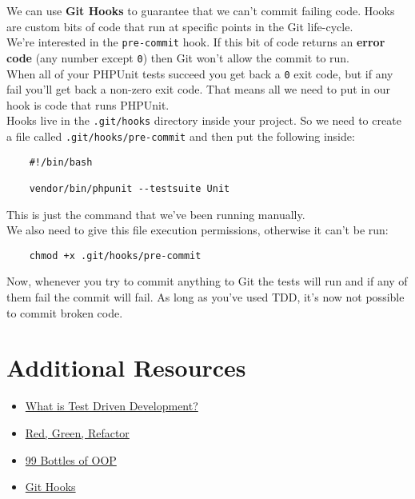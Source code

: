 We can use \textbf{Git Hooks} to guarantee that we can't commit failing code. Hooks are custom bits of code that run at specific points in the Git life-cycle.
\\

We're interested in the \texttt{pre-commit} hook. If this bit of code returns an \textbf{error code} (any number except \texttt{0}) then Git won't allow the commit to run.
\\

When all of your PHPUnit tests succeed you get back a \texttt{0} exit code, but if any fail you'll get back a non-zero exit code. That means all we need to put in our hook is code that runs PHPUnit.
\\

Hooks live in the \texttt{.git/hooks} directory inside your project. So we need to create a file called \texttt{.git/hooks/pre-commit} and then put the following inside:

\begin{verbatim}
    #!/bin/bash

    vendor/bin/phpunit --testsuite Unit
\end{verbatim}

This is just the command that we've been running manually.
\\

We also need to give this file execution permissions, otherwise it can't be run:

\begin{verbatim}
    chmod +x .git/hooks/pre-commit
\end{verbatim}

Now, whenever you try to commit anything to Git the tests will run and if any of them fail the commit will fail. As long as you've used TDD, it's now not possible to commit broken code.


\section{Additional Resources}

\begin{itemize}[leftmargin=*]
    \item \href{https://www.freecodecamp.org/news/test-driven-development-what-it-is-and-what-it-is-not-41fa6bca02a2/}{What is Test Driven Development?}
    \item \href{https://www.codecademy.com/articles/tdd-red-green-refactor}{Red, Green, Refactor}
    \item \href{https://www.sandimetz.com/99bottles}{99 Bottles of OOP}
    \item \href{https://git-scm.com/book/en/v2/Customizing-Git-Git-Hooks}{Git Hooks}
\end{itemize}
